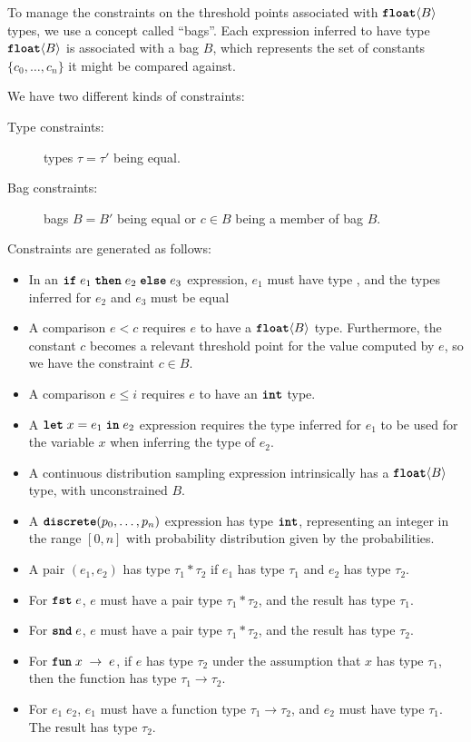 \documentclass[nonacm,anonymous]{acmart}
\newcommand{\letkw}{\text{\ttfamily\bfseries let}}
\newcommand{\inkw}{\text{\ttfamily\bfseries in}}
\newcommand{\ifkw}{\text{\ttfamily\bfseries if}}
\newcommand{\thenkw}{\text{\ttfamily\bfseries then}}
\newcommand{\elsekw}{\text{\ttfamily\bfseries else}}
\newcommand{\discrete}{\text{\ttfamily\bfseries discrete}}
\newcommand{\fstkw}{\text{\ttfamily\bfseries fst}}
\newcommand{\sndkw}{\text{\ttfamily\bfseries snd}}
\newcommand{\funkw}{\text{\ttfamily\bfseries fun}}
\newcommand{\bool}{\text{\ttfamily\bfseries bool}}
\newcommand{\intty}{\text{\ttfamily\bfseries int}}
\newcommand{\float}{\text{\ttfamily\bfseries float}}
\begin{document}
To manage the constraints on the threshold points associated with $\float\langle B \rangle$ types, we use a concept called ``bags''. Each expression inferred to have type $\float\langle B \rangle$ is associated with a bag $B$, which represents the set of constants $\{c_0, \dots, c_n\}$ it might be compared against. 

We have two different kinds of constraints:
\begin{description}
    \item[Type constraints:] types $\tau=\tau'$ being equal.
    \item[Bag constraints:] bags $B=B'$ being equal or $c \in B$ being a member of bag $B$.
\end{description}

Constraints are generated as follows:
\begin{itemize}
    \item In an $\ifkw \; e_1\; \thenkw \; e_2\; \elsekw \; e_3$ expression, $e_1$ must have type \bool, and the types inferred for $e_2$ and $e_3$ must be equal
    \item A comparison $e < c$ requires $e$ to have a $\float\langle B \rangle$ type. Furthermore, the constant $c$ becomes a relevant threshold point for the value computed by $e$, so we have the constraint $c \in B$.
    \item A comparison $e \leq i$ requires $e$ to have an $\intty$ type.
    \item A $\letkw \; x = e_1 \; \inkw \; e_2$ expression requires the type inferred for $e_1$ to be used for the variable $x$ when inferring the type of $e_2$.
    \item A continuous distribution sampling expression intrinsically has a $\float\langle B \rangle$ type, with unconstrained $B$.
    \item A $\discrete(p_0, \ldots, p_n)$ expression has type $\intty$, representing an integer in the range $[0,n]$ with probability distribution given by the probabilities.
    \item A pair $(e_1, e_2)$ has type $\tau_1 * \tau_2$ if $e_1$ has type $\tau_1$ and $e_2$ has type $\tau_2$.
    \item For $\fstkw \; e$, $e$ must have a pair type $\tau_1 * \tau_2$, and the result has type $\tau_1$.
    \item For $\sndkw \; e$, $e$ must have a pair type $\tau_1 * \tau_2$, and the result has type $\tau_2$.
    \item For $\funkw \; x \; \rightarrow \; e$, if $e$ has type $\tau_2$ under the assumption that $x$ has type $\tau_1$, then the function has type $\tau_1 \rightarrow \tau_2$.
    \item For $e_1 \; e_2$, $e_1$ must have a function type $\tau_1 \rightarrow \tau_2$, and $e_2$ must have type $\tau_1$. The result has type $\tau_2$.
\end{itemize}
\end{document}
